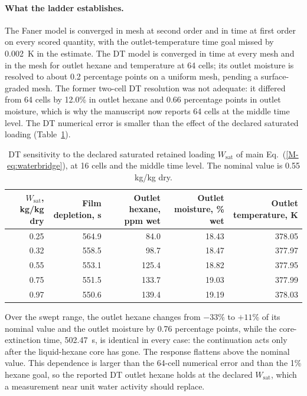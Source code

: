 \documentclass[11pt]{article}
\begin{document}
\paragraph{What the ladder establishes.}
The Faner model is converged in mesh at second order and in time at first
order on every scored quantity, with the outlet-temperature time goal
missed by 0.002~K in the estimate. The DT model is
converged in time at every mesh and in the mesh for outlet hexane and
temperature at 64 cells; its outlet moisture is resolved to about
0.2 percentage points on a uniform mesh, pending a surface-graded mesh. The
former two-cell DT resolution was not adequate: it differed from 64 cells
by 12.0\% in outlet hexane and 0.66 percentage points in outlet moisture,
which is why the manuscript now reports 64 cells at the middle time
level. The DT numerical error is smaller than the effect of the declared
saturated loading (Table~\ref{tab:sub:wsat}).

\begin{table}[htbp]\centering\footnotesize
\caption{DT sensitivity to the declared saturated retained loading
$W_{\mathrm{sat}}$ of main Eq.~(\ref*{M-eq:waterbridge}), at 16 cells and
the middle time level. The nominal value is 0.55 kg/kg dry.}\label{tab:sub:wsat}
\begin{tabular}{@{}rrrrr@{}}\toprule
$W_{\mathrm{sat}}$, kg/kg dry & Film depletion, s & Outlet hexane, ppm wet & Outlet moisture, \% wet & Outlet temperature, K\\\midrule
0.25 & 564.9 & 84.0 & 18.43 & 378.05\\
0.32 & 558.5 & 98.7 & 18.47 & 377.97\\
0.55 & 553.1 & 125.4 & 18.82 & 377.95\\
0.75 & 551.5 & 133.7 & 19.03 & 377.99\\
0.97 & 550.6 & 139.4 & 19.19 & 378.03\\
\bottomrule\end{tabular}
\end{table}

Over the swept range, the outlet hexane changes from $-33$\% to $+11$\% of
its nominal value and the outlet moisture by 0.76 percentage points, while
the core-extinction time, 502.47~s, is identical in every case: the
continuation acts only after the liquid-hexane core has gone. The response
flattens above the nominal value. This dependence is larger than the
64-cell numerical error and than the 1\% hexane goal, so the reported DT
outlet hexane holds at the declared $W_{\mathrm{sat}}$, which a measurement
near unit water activity should replace.
\end{document}
